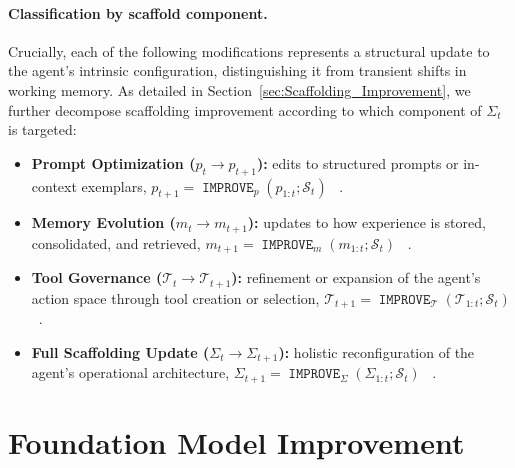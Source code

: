 \documentclass{article}
\newcommand{\IMPROVE}{\operatorname{\mathtt{IMPROVE}}}
\begin{document}
\paragraph{Classification by scaffold component.}
Crucially, each of the following modifications represents a structural update to the agent's intrinsic configuration, distinguishing it from transient shifts in working memory. As detailed in Section~\ref{sec:Scaffolding_Improvement}, we further decompose scaffolding improvement according to which component of $\Sigma_t$ is targeted:
\begin{itemize}
    \item \textbf{Prompt Optimization ($p_t \rightarrow p_{t+1}$):}
     edits to structured prompts or in-context exemplars,
    $p_{t+1}=\IMPROVE_{p}(p_{1:t}; \mathcal{S}_t)$
    ~\citep{yuksekgonul2024textgradautomaticdifferentiationtext, guo2025evopromptconnectingllmsevolutionary, fernando2024promptbreeder, zhou2022large}.

    \item \textbf{Memory Evolution ($m_t \rightarrow m_{t+1}$):}
     updates to how experience is stored, consolidated, and retrieved,
    $m_{t+1}=\IMPROVE_{m}(m_{1:t}; \mathcal{S}_t)$
    ~\citep{chhikara2025mem0buildingproductionreadyai, wang2024agentworkflowmemory, zhang2025memgenweavinggenerativelatent, zhong2024memorybank}.

    \item \textbf{Tool Governance ($\mathcal{T}_t \rightarrow \mathcal{T}_{t+1}$):}
     refinement or expansion of the agent’s action space through tool creation or selection,
    $\mathcal{T}_{t+1}=\IMPROVE_{\mathcal{T}}(\mathcal{T}_{1:t}; \mathcal{S}_t)$
    ~\citep{haque2025advancedtoollearningselection, wang2025toolgenunifiedtoolretrieval, dong2025tool, zhang2025agentorchestraorchestratinghierarchicalmultiagent}.

    \item \textbf{Full Scaffolding Update ($\Sigma_t \rightarrow \Sigma_{t+1}$):}
    holistic reconfiguration of the agent’s operational architecture,
    $\Sigma_{t+1}=\IMPROVE_{\Sigma}(\Sigma_{1:t}; \mathcal{S}_t)$
    ~\citep{hu2025automateddesignagenticsystems, zhang2025darwingodelmachineopenended, novikov2025alphaevolvecodingagentscientific, xia2025livesweagentsoftwareengineeringagents}.
\end{itemize}


\section{Foundation Model Improvement}
\label{sec:Foundation_Model_Improvement}
\end{document}
